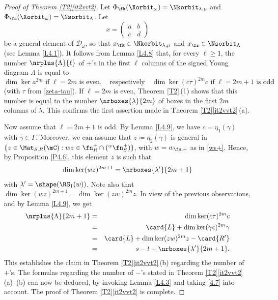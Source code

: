 \begin{proof}[Proof of Theorem \ref{T2}\ref{it2vvt2}]
Let $\Phi_\fk(\Xorbit_\omega)=\Nkorbit_{\lambda,\mu}$ and $\Phi_\fs(\Xorbit_\omega)=\Nsorbit_\Lambda$.
Let
\[x=\begin{pmatrix}a & b\\ c & d\end{pmatrix}\]
be a general element of $\mathcal{D}_\omega$, so that $x_\fk\in\Nkorbit_{\lambda,\mu}$ and $x_\fs\in\Nsorbit_\Lambda$
(see Lemma \ref{L4.1}).
It follows from Lemma \ref{L4.8} that, for every $\ell\geq 1$,
the number $\nrplus{\Lambda}{\ell}$ of $+$'s in the first $\ell$ columns of the signed Young diagram $\Lambda$ is equal to
\[\dim\ker a^{2m}\mbox{ if $\ell=2m$ is even},\quad\mbox{respectively}\quad \dim \ker(c\tau)^{2m} c\mbox{ if $\ell=2m+1$ is odd}\]
(with $\tau$ from \eqref{zeta-tau}).
If $\ell=2m$ is even, Theorem \ref{T2}\,(1) shows that this number is equal to the number $\nrboxes{\lambda}{2m}$ of boxes in the first $2m$ columns of $\lambda$.
This confirms the first assertion made in Theorem \ref{T2}\ref{it2vvt2}\,(a).

Now assume that $\ell=2m+1$ is odd. By Lemma \ref{L4.9}, we have $c=\eta_1(\gamma)$ with $\gamma\in\Gamma$. Moreover, we can assume that $z\coloneqq \eta_2(\gamma)$ is general in $\{z\in\Mat_{S,R}(\mC):wz\in\fn_R^+\cap({}^w\fn_S^+)\}$,
with $w=w_{\fs,+}$ as in \eqref{ws+}. Hence, by Proposition \ref{P4.6}, this element $z$ is such that
\[
\dim \ker (wz)^{2m+1}=\nrboxes{\lambda'}{2m+1}
\]
with $\lambda'=\shape(\RS_1(w))$.
Note also that $\dim\ker(wz)^{2m+1}=\dim\ker(zw)^{2m}z$. In view of the previous observations, and by Lemma \ref{L4.9}, we get
\begin{eqnarray*}
\nrplus{\Lambda}{2m+1} & = & \dim \ker(c\tau)^{2m} c\\ & = & \card{L}+\dim \ker (\gamma\varsigma)^{2m}\gamma\\
 & = & \card{L}+\dim \ker(zw)^{2m}z-\card{R'}\\
 & = & s-t+\nrboxes{\lambda'}{2m+1}.
\end{eqnarray*}
This establishes the claim in Theorem \ref{T2}\ref{it2vvt2}\,(b) regarding the number of $+$'s. The formulas regarding the number of $-$'s stated in Theorem \ref{T2}\ref{it2vvt2}\,(a)--(b) can now be deduced, by invoking Lemma \ref{L4.3} and taking \eqref{4.7} into account. The proof of Theorem \ref{T2}\ref{it2vvt2} is complete.
\end{proof}

